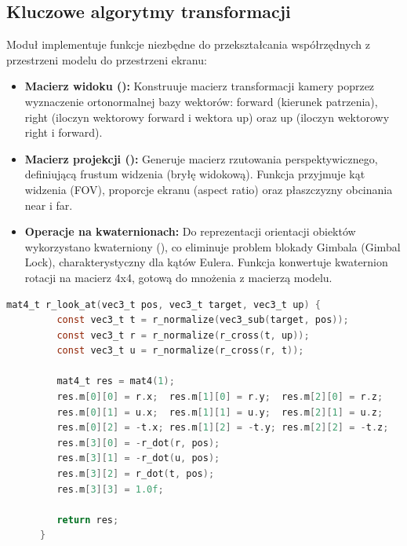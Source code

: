          \newpage

        \subsection{Kluczowe algorytmy transformacji}
         Moduł  implementuje funkcje niezbędne do przekształcania współrzędnych z przestrzeni modelu do przestrzeni ekranu:

         \begin{itemize}
         \item[---] \textbf{Macierz widoku ():} Konstruuje macierz transformacji kamery poprzez wyznaczenie ortonormalnej bazy wektorów: forward (kierunek patrzenia), right (iloczyn wektorowy forward i wektora up) oraz up (iloczyn wektorowy right i forward).
         \item[---] \textbf{Macierz projekcji ():} Generuje macierz rzutowania perspektywicznego, definiującą frustum widzenia (bryłę widokową). Funkcja przyjmuje kąt widzenia (FOV), proporcje ekranu (aspect ratio) oraz płaszczyzny obcinania near i far.
         \item[---] \textbf{Operacje na kwaternionach:} Do reprezentacji orientacji obiektów wykorzystano kwaterniony (), co eliminuje problem blokady Gimbala (Gimbal Lock), charakterystyczny dla kątów Eulera. Funkcja  konwertuje kwaternion rotacji na macierz 4x4, gotową do mnożenia z macierzą modelu.
         \end{itemize}

         \vspace{1em}
         \begin{lstlisting}[language=C, caption={Autorska implementacja funkcji wyznaczającej macierz widoku (View Matrix) na podstawie iloczynów wektorowych określających orientację kamery przestrzennej}, label={lst:look_at}]
      mat4_t r_look_at(vec3_t pos, vec3_t target, vec3_t up) {
         const vec3_t t = r_normalize(vec3_sub(target, pos));
         const vec3_t r = r_normalize(r_cross(t, up));
         const vec3_t u = r_normalize(r_cross(r, t));

         mat4_t res = mat4(1);
         res.m[0][0] = r.x;  res.m[1][0] = r.y;  res.m[2][0] = r.z;
         res.m[0][1] = u.x;  res.m[1][1] = u.y;  res.m[2][1] = u.z;
         res.m[0][2] = -t.x; res.m[1][2] = -t.y; res.m[2][2] = -t.z;
         res.m[3][0] = -r_dot(r, pos);
         res.m[3][1] = -r_dot(u, pos);
         res.m[3][2] = r_dot(t, pos);
         res.m[3][3] = 1.0f;

         return res;
      }
         \end{lstlisting}

